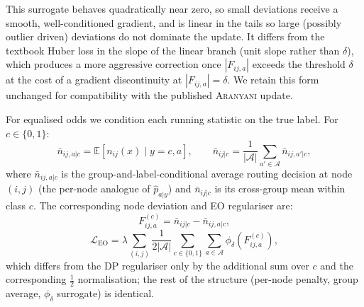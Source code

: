 \documentclass[sigconf,anonymous,review]{acmart}
\begin{document}
This surrogate behaves quadratically near zero, so small deviations receive a smooth, well-conditioned gradient, and is linear in the tails so large (possibly
outlier driven) deviations do not dominate the update. It differs from the textbook Huber loss in the slope of the linear branch (unit slope rather than $\delta$),
which produces a more aggressive correction once $|F_{ij,a}|$ exceeds the threshold $\delta$ at the cost of a gradient discontinuity at $|F_{ij,a}| = \delta$. We retain
this form unchanged for compatibility with the published \textsc{Aranyani} update.

For equalised odds we condition each running statistic on the true label. For $c \in \{0,1\}$:
\[
\bar{n}_{ij,a|c} = \mathbb{E}[n_{ij}(x) \mid y=c, a], \qquad
\bar{n}_{ij|c} = \frac{1}{|\mathcal{A}|}\sum_{a' \in \mathcal{A}} \bar{n}_{ij,a'|c},
\]
where $\bar{n}_{ij,a|c}$ is the group-and-label-conditional average routing decision at node $(i,j)$ (the per-node analogue of $\hat{p}_{a|y}$) and $\bar{n}_{ij|c}$ is its
cross-group mean within class $c$. The corresponding node deviation and EO regulariser are:
\[
F_{ij,a}^{(c)} = \bar{n}_{ij|c} - \bar{n}_{ij,a|c},
\]
\[
\mathcal{L}_{\text{EO}} = \lambda \sum_{(i,j)} \frac{1}{2|\mathcal{A}|}\sum_{c \in \{0,1\}}\sum_{a \in \mathcal{A}} \phi_{\delta}\!\left(F_{ij,a}^{(c)}\right),
\]
which differs from the DP regulariser only by the additional sum over $c$ and the corresponding $\tfrac{1}{2}$ normalisation; the rest of the structure (per-node penalty,
group average, $\phi_\delta$ surrogate) is identical.
\end{document}
